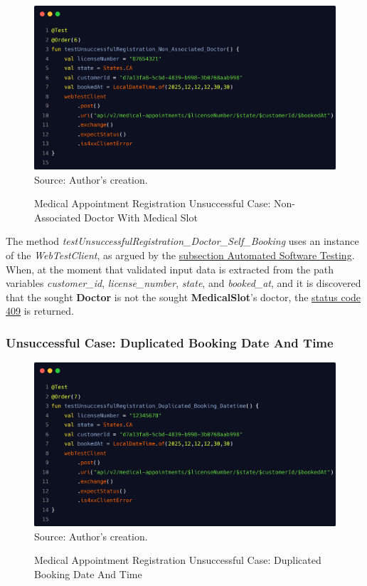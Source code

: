 \begin{figure}[H]
	\centering
	\caption{Medical Appointment Registration Unsuccessful Case: Non-Associated Doctor With Medical Slot}
	\includegraphics[width=1\linewidth]{figures/medical_appointment_registration_integration_test_unsuccessful_case_nonassociated_doctor.png}
	\label{fig:medical_appointment_registration_integration_test_unsuccessful_case_nonassociated_doctor}
	\footnotesize Source: Author's creation.
\end{figure}

The method \textit{testUnsuccessfulRegistration\_Doctor\_Self\_Booking} uses an instance of the \textit{WebTestClient}, as argued by the \hyperref[subsection:automated_software_testing]{subsection Automated Software Testing}. When, at the moment that validated input data is extracted from the path variables \textit{customer\_id}, \textit{license\_number}, \textit{state}, and \textit{booked\_at}, and it is discovered that the sought \textbf{Doctor} is not the sought \textbf{MedicalSlot}'s doctor, the \hyperref[tab:summary_http_status_codes]{status code 409} is returned.

\subsubsection{Unsuccessful Case: Duplicated Booking Date And Time}

\begin{figure}[H]
	\centering
	\caption{Medical Appointment Registration Unsuccessful Case: Duplicated Booking Date And Time}
	\includegraphics[width=1\linewidth]{figures/medical_appointment_registration_integration_test_unsuccessful_case_duplicared_booking_datetime.png}
	\label{fig:medical_appointment_registration_integration_test_unsuccessful_case_duplicared_booking_datetime}
	\footnotesize Source: Author's creation.
\end{figure}

